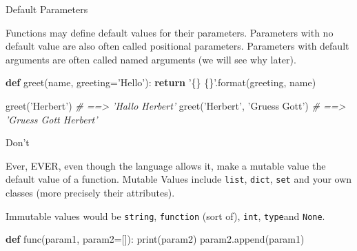 \documentclass[ignorenonframetext,]{beamer}
\newenvironment{Shaded}{}{}
\newcommand{\KeywordTok}[1]{\textcolor[rgb]{0.00,0.44,0.13}{\textbf{{#1}}}}
\newcommand{\StringTok}[1]{\textcolor[rgb]{0.25,0.44,0.63}{{#1}}}
\newcommand{\CommentTok}[1]{\textcolor[rgb]{0.38,0.63,0.69}{\textit{{#1}}}}
\newcommand{\ControlFlowTok}[1]{\textcolor[rgb]{0.00,0.44,0.13}{\textbf{{#1}}}}
\newcommand{\OperatorTok}[1]{\textcolor[rgb]{0.40,0.40,0.40}{{#1}}}
\newcommand{\BuiltInTok}[1]{{#1}}
\newcommand{\NormalTok}[1]{{#1}}
\begin{document}
\begin{frame}[fragile]{Default Parameters}

Functions may define default values for their parameters. Parameters
with no default value are also often called positional parameters.
Parameters with default arguments are often called named arguments (we
will see why later).

\begin{Shaded}
\begin{Highlighting}[]
\KeywordTok{def} \NormalTok{greet(name, greeting}\OperatorTok{=}\StringTok{'Hello'}\NormalTok{):}
    \ControlFlowTok{return} \StringTok{'\{\} \{\}'}\NormalTok{.}\BuiltInTok{format}\NormalTok{(greeting, name)}

\NormalTok{greet(}\StringTok{'Herbert'}\NormalTok{)  }\CommentTok{# ==> 'Hallo Herbert'}
\NormalTok{greet(}\StringTok{'Herbert'}\NormalTok{, }\StringTok{'Gruess Gott'}\NormalTok{)  }\CommentTok{# ==> 'Gruess Gott Herbert'}
\end{Highlighting}
\end{Shaded}

\end{frame}

\begin{frame}[fragile]

\begin{block}{Don't}

Ever, EVER, even though the language allows it, make a mutable value the
default value of a function. Mutable Values include \texttt{list},
\texttt{dict}, \texttt{set} and your own classes (more precisely their
attributes).

Immutable values would be \texttt{string}, \texttt{function} (sort of),
\texttt{int}, \texttt{type}and \texttt{None}.

\begin{Shaded}
\begin{Highlighting}[]
\KeywordTok{def} \NormalTok{func(param1, param2}\OperatorTok{=}\NormalTok{[]):}
    \BuiltInTok{print}\NormalTok{(param2)}
    \NormalTok{param2.append(param1)}
\end{Highlighting}
\end{Shaded}

\end{block}

\end{frame}
\end{document}
